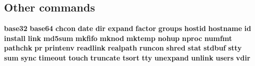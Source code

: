\subsection{Other commands}
\textbf{base32} \textbf{base64}
\textbf{chcon}
\textbf{date} \textbf{dir}
\textbf{expand}
\textbf{factor}
\textbf{groups}
\textbf{hostid} \textbf{hostname}
\textbf{id} \textbf{install}
\textbf{link}
\textbf{md5sum} \textbf{mkfifo} \textbf{mknod} \textbf{mktemp}
\textbf{nohup} \textbf{nproc} \textbf{numfmt}
\textbf{pathchk} \textbf{pr} \textbf{printenv}
\textbf{readlink} \textbf{realpath} \textbf{runcon}
\textbf{shred} \textbf{stat} \textbf{stdbuf} \textbf{stty} \textbf{sum} \textbf{sync}
\textbf{timeout} \textbf{touch} \textbf{truncate} \textbf{tsort} \textbf{tty}
\textbf{unexpand} \textbf{unlink} \textbf{users}
\textbf{vdir} 